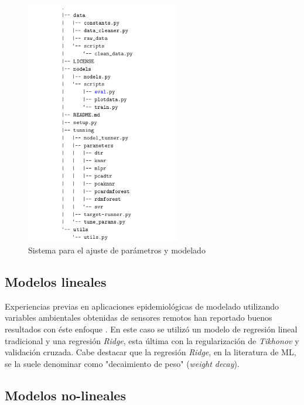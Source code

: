         \begin{figure}[hbt]
        \centering%
        \includegraphics[width=0.6\textwidth]{images/proyecto_modeling}%
        \caption{Sistema para el ajuste de parámetros y modelado}\label{fig:proyecto_modelado}
        \end{figure}



    \subsection{Modelos lineales}

      \par Experiencias previas en aplicaciones epidemiológicas de
        modelado utilizando variables ambientales obtenidas de sensores
        remotos han reportado buenos resultados con éste
        enfoque \cite{akodon_modeling, multilinear_apli, modis_data}.
        En este caso se utilizó un modelo de regresión lineal tradicional y
        una regresión \textit{Ridge}, esta última con la regularización de
        \textit{Tikhonov} y validación cruzada. Cabe destacar que la
        regresión \textit{Ridge}, en la literatura de ML, se la suele denominar
        como "decaimiento de peso" (\textit{weight decay}).

  \subsection{Modelos no-lineales}

